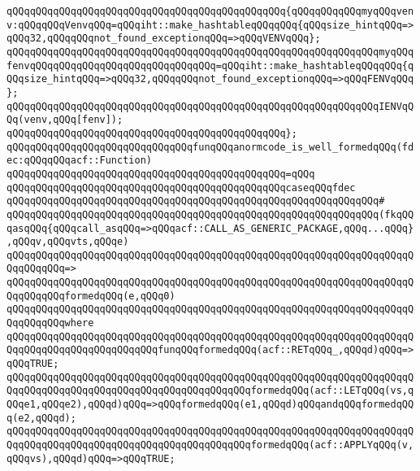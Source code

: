 \verb|qQQqqQQqqQQqqQQqqQQqqQQqqQQqqQQqqQQqqQQqqQQqqQQq{qQQqqQQqqQQqmyqQQqvenv:qQQqqQQqVenvqQQq=qQQqiht::make_hashtableqQQqqQQq{qQQqsize_hintqQQq=>qQQq32,qQQqqQQqnot_found_exceptionqQQq=>qQQqVENVqQQq};|\newline
\verb|qQQqqQQqqQQqqQQqqQQqqQQqqQQqqQQqqQQqqQQqqQQqqQQqqQQqqQQqqQQqqQQqmyqQQqfenvqQQqqQQqqQQqqQQqqQQqqQQqqQQqqQQq=qQQqiht::make_hashtableqQQqqQQq{qQQqsize_hintqQQq=>qQQq32,qQQqqQQqnot_found_exceptionqQQq=>qQQqFENVqQQq};|\newline
\newline
\verb|qQQqqQQqqQQqqQQqqQQqqQQqqQQqqQQqqQQqqQQqqQQqqQQqqQQqqQQqqQQqqQQqIENVqQQq(venv,qQQq[fenv]);|\newline
\verb|qQQqqQQqqQQqqQQqqQQqqQQqqQQqqQQqqQQqqQQqqQQqqQQq};|\newline
\newline
\newline
\verb|qQQqqQQqqQQqqQQqqQQqqQQqqQQqqQQqfunqQQqanormcode_is_well_formedqQQq(fdec:qQQqqQQqacf::Function)|\newline
\verb|qQQqqQQqqQQqqQQqqQQqqQQqqQQqqQQqqQQqqQQqqQQqqQQq=qQQq|\newline
\verb|qQQqqQQqqQQqqQQqqQQqqQQqqQQqqQQqqQQqqQQqqQQqqQQqcaseqQQqfdec|\newline
\verb|qQQqqQQqqQQqqQQqqQQqqQQqqQQqqQQqqQQqqQQqqQQqqQQqqQQqqQQqqQQqqQQq#|\newline
\verb|qQQqqQQqqQQqqQQqqQQqqQQqqQQqqQQqqQQqqQQqqQQqqQQqqQQqqQQqqQQqqQQq(fkqQQqasqQQq{qQQqcall_asqQQq=>qQQqacf::CALL_AS_GENERIC_PACKAGE,qQQq...qQQq},qQQqv,qQQqvts,qQQqe)|\newline
\verb|qQQqqQQqqQQqqQQqqQQqqQQqqQQqqQQqqQQqqQQqqQQqqQQqqQQqqQQqqQQqqQQqqQQqqQQqqQQqqQQq=>|\newline
\verb|qQQqqQQqqQQqqQQqqQQqqQQqqQQqqQQqqQQqqQQqqQQqqQQqqQQqqQQqqQQqqQQqqQQqqQQqqQQqqQQqformedqQQq(e,qQQq0)|\newline
\verb|qQQqqQQqqQQqqQQqqQQqqQQqqQQqqQQqqQQqqQQqqQQqqQQqqQQqqQQqqQQqqQQqqQQqqQQqqQQqqQQqwhere|\newline
\verb|qQQqqQQqqQQqqQQqqQQqqQQqqQQqqQQqqQQqqQQqqQQqqQQqqQQqqQQqqQQqqQQqqQQqqQQqqQQqqQQqqQQqqQQqqQQqqQQqfunqQQqformedqQQq(acf::RETqQQq_,qQQqd)qQQq=>qQQqTRUE;|\newline
\verb|qQQqqQQqqQQqqQQqqQQqqQQqqQQqqQQqqQQqqQQqqQQqqQQqqQQqqQQqqQQqqQQqqQQqqQQqqQQqqQQqqQQqqQQqqQQqqQQqqQQqqQQqqQQqqQQqformedqQQq(acf::LETqQQq(vs,qQQqe1,qQQqe2),qQQqd)qQQq=>qQQqformedqQQq(e1,qQQqd)qQQqandqQQqformedqQQq(e2,qQQqd);|\newline
\verb|qQQqqQQqqQQqqQQqqQQqqQQqqQQqqQQqqQQqqQQqqQQqqQQqqQQqqQQqqQQqqQQqqQQqqQQqqQQqqQQqqQQqqQQqqQQqqQQqqQQqqQQqqQQqqQQqformedqQQq(acf::APPLYqQQq(v,qQQqvs),qQQqd)qQQq=>qQQqTRUE;|\newline
